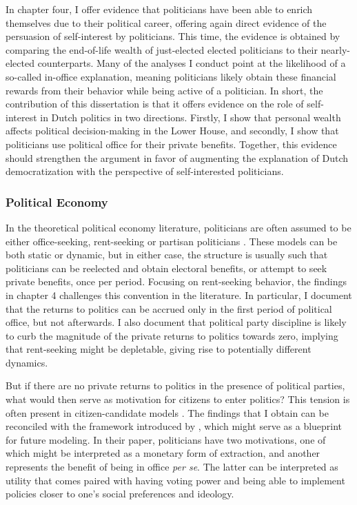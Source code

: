 In chapter four, I offer evidence that politicians have been able to enrich themselves due to their political career, offering again direct evidence of the persuasion of self-interest by politicians. This time, the evidence is obtained by comparing the end-of-life wealth of just-elected elected politicians to their nearly-elected counterparts. Many of the analyses I conduct point at the likelihood of a so-called in-office explanation, meaning politicians likely obtain these financial rewards from their behavior while being active of a politician. In short, the contribution of this dissertation is that it offers evidence on the role of self-interest in Dutch politics in two directions. Firstly, I show that personal wealth affects political decision-making in the Lower House, and secondly, I show that politicians use political office for their private benefits. Together, this evidence should strengthen the argument in favor of augmenting the explanation of Dutch democratization with the perspective of self-interested politicians. 


\subsubsection{Political Economy}

In the theoretical political economy literature, politicians are often assumed to be either office-seeking, rent-seeking or partisan politicians \citep{persson2002political}. These models can be both static or dynamic, but in either case, the structure is usually such that politicians can be reelected and obtain electoral benefits, or attempt to seek private benefits, once per period. Focusing on rent-seeking behavior, the findings in chapter 4 challenges this convention in the literature. In particular, I document that the returns to politics can be accrued only in the first period of political office, but not afterwards. I also document that political party discipline is likely to curb the magnitude of the private returns to politics towards zero, implying that rent-seeking might be depletable, giving rise to potentially different dynamics. 

But if there are no private returns to politics in the presence of political parties, what would then serve as motivation for citizens to enter politics? This tension is often present in citizen-candidate models \citep[see e.g.][]{besley2005political}. The findings that I obtain can be reconciled with the framework introduced by \cite{svaleryd2009political}, which might serve as a blueprint for future modeling. In their paper, politicians have two motivations, one of which might be interpreted as a monetary form of extraction, and another represents the benefit of being in office \textit{per se}. The latter can be interpreted as utility that comes paired with having voting power and being able to implement policies closer to one's social preferences and ideology. 

